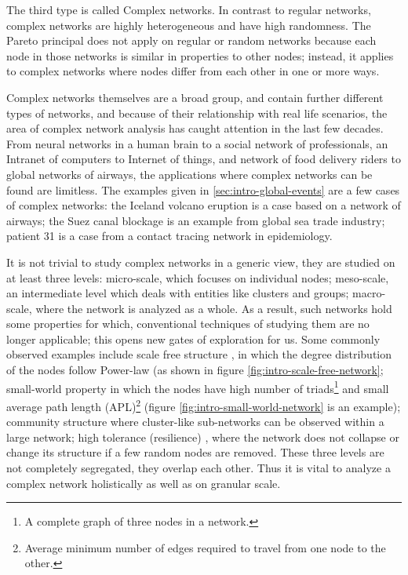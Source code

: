 	
	The third type is called Complex networks. In contrast to regular networks, complex networks are highly heterogeneous and have high randomness. The Pareto principal does not apply on regular or random networks because each node in those networks is similar in properties to other nodes; instead, it applies to complex networks where nodes differ from each other in one or more ways.
	
	Complex networks themselves are a broad group, and contain further different types of networks, and because of their relationship with real life scenarios, the area of complex network analysis has caught attention in the last few decades. From neural networks in a human brain to a social network of professionals, an Intranet of computers to Internet of things, and network of food delivery riders to global networks of airways, the applications where complex networks can be found are limitless. The examples given in \ref{sec:intro-global-events} are a few cases of complex networks: the Iceland volcano eruption is a case based on a network of airways; the Suez canal blockage is an example from global sea trade industry; patient 31 is a case from a contact tracing network in epidemiology.
	
	It is not trivial to study complex networks in a generic view, they are studied on at least three levels: micro-scale, which focuses on individual nodes; meso-scale, an intermediate level which deals with entities like clusters and groups; macro-scale, where the network is analyzed as a whole. As a result, such networks hold some properties for which, conventional techniques of studying them are no longer applicable; this opens new gates of exploration for us. Some commonly observed examples include scale free structure \cite{barabasi1999}, in which the degree distribution of the nodes follow Power-law (as shown in figure \ref{fig:intro-scale-free-network}; small-world property \cite{watts1998} in which the nodes have high number of triads\footnote{A complete graph of three nodes in a network.} and small average path length (APL)\footnote{Average minimum number of edges required to travel from one node to the other.} (figure \ref{fig:intro-small-world-network} is an example); community structure \cite{strogatz2001} where cluster-like sub-networks can be observed within a large network; high tolerance (resilience) \cite{albert2004}, where the network does not collapse or change its structure if a few random nodes are removed. These three levels are not completely segregated, they overlap each other. Thus it is vital to analyze a complex network holistically as well as on granular scale.
	

